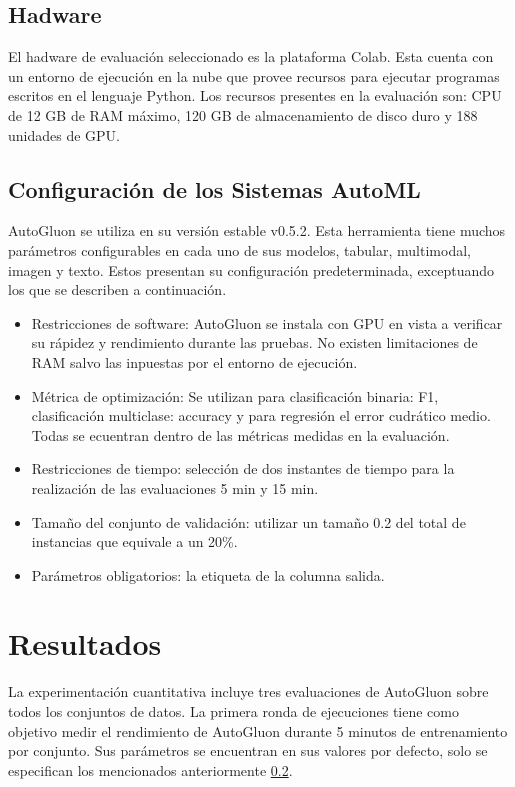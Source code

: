 \subsection{Hadware}\label{subsection:hadware}
El hadware de evaluación seleccionado es la plataforma Colab. Esta cuenta con un entorno de ejecución en la nube que provee recursos para ejecutar programas 
escritos en el lenguaje Python. Los recursos presentes en la evaluación son: CPU de 12 GB de RAM máximo, 120 GB de almacenamiento de disco duro y 188 unidades de GPU.

\subsection{Configuración de los Sistemas AutoML}\label{subsection:conf-marcos}
AutoGluon se utiliza en su versión estable v0.5.2. Esta herramienta tiene muchos parámetros configurables en cada uno de sus modelos, tabular, multimodal, imagen y texto. 
Estos presentan su configuración predeterminada, exceptuando los que se describen a continuación.
\begin{itemize}
    \item Restricciones de software: AutoGluon se instala con GPU en vista a verificar su rápidez y rendimiento durante las pruebas. No existen limitaciones de RAM salvo
    las inpuestas por el entorno de ejecución.
    \item Métrica de optimización: Se utilizan para clasificación binaria: F1, clasificación multiclase: accuracy y para regresión el error cudrático medio. Todas se 
    ecuentran dentro de las métricas medidas en la evaluación.
    \item Restricciones de tiempo: selección de dos instantes de tiempo para la realización de las evaluaciones 5 min y 15 min. 
    \item Tamaño del conjunto de validación: utilizar un tamaño 0.2 del total de instancias que equivale a un 20\%. 
    \item Parámetros obligatorios: la etiqueta de la columna salida.  
\end{itemize}
\section{Resultados}\label{section:results}
La experimentación cuantitativa incluye tres evaluaciones de AutoGluon sobre todos los conjuntos de datos.
La primera ronda de ejecuciones tiene como objetivo medir el rendimiento de AutoGluon durante 5 minutos de entrenamiento por conjunto. Sus parámetros 
se encuentran en sus valores por defecto, solo se especifican los mencionados anteriormente \ref{subsection:conf-marcos}. 


